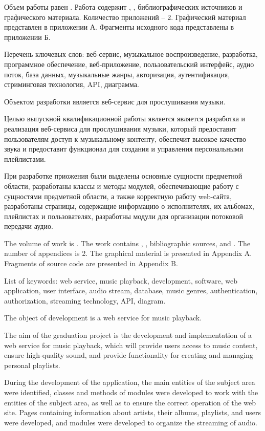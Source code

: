 
Объем работы равен . Работа содержит , ,  библиографических источников и  графического материала. Количество приложений – 2. Графический материал представлен в приложении А. Фрагменты исходного кода представлены в приложении Б.

Перечень ключевых слов: веб-сервис, музыкальное воспроизведение, разработка, программное обеспечение, веб-приложение, пользовательский интерфейс, аудио поток, база данных, музыкальные жанры, авторизация, аутентификация, стриминговая технология, API, диаграмма.

Объектом разработки является веб-сервис для прослушивания музыки.

Целью выпускной квалификационной работы является является разработка и реализация веб-сервиса для прослушивания музыки, который предоставит пользователям  доступ к музыкальному контенту, обеспечит высокое качество звука и предоставит функционал для создания и управления персональными плейлистами.

При разработке приожения были выделены основные сущности предметной области, разработаны классы и методы модулей, обеспечивающие работу с сущностями предметной области, а также корректную работу web-сайта, разработаны страницы, содержащие информацию о исполнителях, их альбомах, плейлистах и пользователях, разработны модули для организации потоковой передачи аудио.

  

The volume of work is . The work contains , ,  bibliographic sources, and . The number of appendices is 2. The graphical material is presented in Appendix A. Fragments of source code are presented in Appendix B.

List of keywords: web service, music playback, development, software, web application, user interface, audio stream, database, music genres, authentication, authorization, streaming technology, API, diagram.

The object of development is a web service for music playback.

The aim of the graduation project is the development and implementation of a web service for music playback, which will provide users access to music content, ensure high-quality sound, and provide functionality for creating and managing personal playlists.

During the development of the application, the main entities of the subject area were identified, classes and methods of modules were developed to work with the entities of the subject area, as well as to ensure the correct operation of the web site. Pages containing information about artists, their albums, playlists, and users were developed, and modules were developed to organize the streaming of audio.
